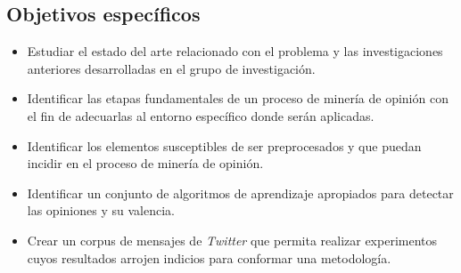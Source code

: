 \begin{introduction}
  \subsection*{Objetivos específicos}
\begin{itemize}
  \item Estudiar el estado del arte relacionado con el problema
  y las investigaciones anteriores 
  desarrolladas en el grupo de investigación.
  \item Identificar las etapas fundamentales de un proceso de 
  minería de opinión con el fin de adecuarlas al entorno específico
  donde serán aplicadas.
 \item Identificar los elementos susceptibles de ser preprocesados
 y que puedan incidir en el proceso de minería de opinión.
 \item Identificar un conjunto de algoritmos de aprendizaje apropiados
 para detectar las opiniones y su valencia.
 \item Crear un corpus de mensajes de \emph{Twitter} que permita realizar 
 experimentos cuyos resultados arrojen indicios para conformar una metodología.
\end{itemize}


\end{introduction}
